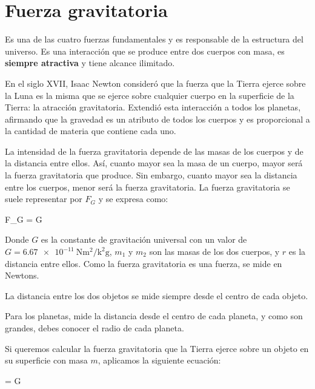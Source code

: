 \section{Fuerza gravitatoria}

Es una de las cuatro fuerzas fundamentales y es responsable de la estructura del universo.
Es una interacción que se produce entre dos cuerpos con masa, es \textbf{siempre atractiva} y tiene alcance ilimitado.

En el siglo XVII, Isaac Newton consideró que la fuerza que la Tierra ejerce sobre la Luna es la misma que se ejerce sobre cualquier cuerpo en la superficie de la Tierra: la atracción gravitatoria.
Extendió esta interacción a todos los planetas, afirmando que la gravedad es un atributo de todos los cuerpos y es proporcional a la cantidad de materia que contiene cada uno.

La intensidad de la fuerza gravitatoria depende de las masas de los cuerpos y de la distancia entre ellos.
Así, cuanto mayor sea la masa de un cuerpo, mayor será la fuerza gravitatoria que produce.
Sin embargo, cuanto mayor sea la distancia entre los cuerpos, menor será la fuerza gravitatoria.
La fuerza gravitatoria se suele representar por \( F_G \) y se expresa como:

\begin{centeredequation}
    F_G = G \cdot {}
\end{centeredequation}

Donde \( G \) es la constante de gravitación universal con un valor de \( G = \qty{6.67e-11}{\newton\square\metre\per\square\kilo\g} \), \( m_1 \) y \( m_2 \) son las masas de los dos cuerpos, y \( r \) es la distancia entre ellos.
Como la fuerza gravitatoria es una fuerza, se mide en Newtons.

\begin{remark}
    La distancia entre los dos objetos se mide siempre desde el centro de cada objeto.
\end{remark}

\begin{remark}
    Para los planetas, mide la distancia desde el centro de cada planeta, y como son grandes, debes conocer el radio de cada planeta.
\end{remark}

Si queremos calcular la fuerza gravitatoria que la Tierra ejerce sobre un objeto en su superficie con masa \( m \), aplicamos la siguiente ecuación:
\vspace*{31pt}
\begin{centeredequation}
    =
    G \cdot
\end{centeredequation}

